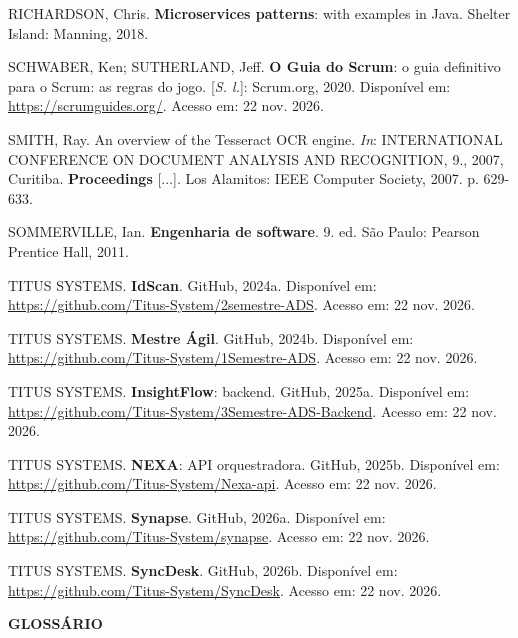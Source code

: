 \documentclass[12pt,a4paper]{article}
\newcommand{\titulosemnumero}[1]{%
  \phantomsection\addcontentsline{toc}{section}{#1}%
  {\noindent\fontsize{14}{17}\selectfont\bfseries #1\par}\vspace{6pt}}
\begin{document}
RICHARDSON, Chris. \textbf{Microservices patterns}: with examples in Java. Shelter Island: Manning, 2018.

SCHWABER, Ken; SUTHERLAND, Jeff. \textbf{O Guia do Scrum}: o guia definitivo para o Scrum: as regras do jogo. [\textit{S. l.}]: Scrum.org, 2020. Disponível em: \url{https://scrumguides.org/}. Acesso em: 22 nov. 2026.

SMITH, Ray. An overview of the Tesseract OCR engine. \textit{In}: INTERNATIONAL CONFERENCE ON DOCUMENT ANALYSIS AND RECOGNITION, 9., 2007, Curitiba. \textbf{Proceedings} [...]. Los Alamitos: IEEE Computer Society, 2007. p. 629-633.

SOMMERVILLE, Ian. \textbf{Engenharia de software}. 9. ed. São Paulo: Pearson Prentice Hall, 2011.

TITUS SYSTEMS. \textbf{IdScan}. GitHub, 2024a. Disponível em: \url{https://github.com/Titus-System/2semestre-ADS}. Acesso em: 22 nov. 2026.

TITUS SYSTEMS. \textbf{Mestre Ágil}. GitHub, 2024b. Disponível em: \url{https://github.com/Titus-System/1Semestre-ADS}. Acesso em: 22 nov. 2026.

TITUS SYSTEMS. \textbf{InsightFlow}: backend. GitHub, 2025a. Disponível em: \url{https://github.com/Titus-System/3Semestre-ADS-Backend}. Acesso em: 22 nov. 2026.

TITUS SYSTEMS. \textbf{NEXA}: API orquestradora. GitHub, 2025b. Disponível em: \url{https://github.com/Titus-System/Nexa-api}. Acesso em: 22 nov. 2026.

TITUS SYSTEMS. \textbf{Synapse}. GitHub, 2026a. Disponível em: \url{https://github.com/Titus-System/synapse}. Acesso em: 22 nov. 2026.

TITUS SYSTEMS. \textbf{SyncDesk}. GitHub, 2026b. Disponível em: \url{https://github.com/Titus-System/SyncDesk}. Acesso em: 22 nov. 2026.

\endgroup

\clearpage
\titulosemnumero{GLOSSÁRIO}
\end{document}
